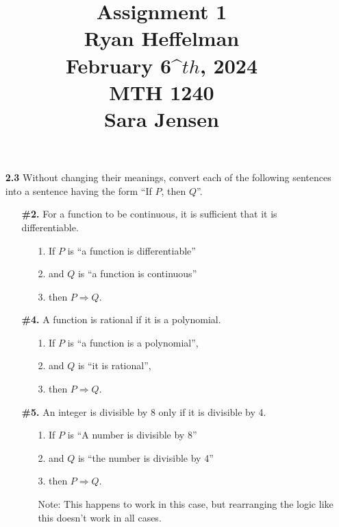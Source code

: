 \documentclass[16pt]{article}
\begin{document}
\large
\date{}
\title{\Large Assignment 1 \\ Ryan Heffelman \\ February 6^\(th\), 2024 \\ MTH 1240 \\ Sara Jensen}
\maketitle
\begin{enumerate}
    \item[\textbf{2.3  }]  Without changing their meanings, convert each of the following sentences into a sentence having the form ``If $P$, then $Q$''.
    \begin{enumerate}
        \item[\textbf{\#2.}] For a function to be continuous, it is sufficient that it is differentiable.
        \begin{enumerate}
            \item[1.] If $P$ is ``a function is differentiable''
            \item[2.] and $Q$ is ``a function is continuous''
            \item[3.] then $P\Rightarrow Q$.
        \end{enumerate}
        \item[\textbf{\#4.}] A function is rational if it is a polynomial.
        \begin{enumerate}
            \item[1.] If $P$ is ``a function is a polynomial'',
            \item[2.] and $Q$ is ``it is rational'',
            \item[3.] then $P\Rightarrow Q$.
        \end{enumerate}
        \item[\textbf{\#5.}] An integer is divisible by 8 only if it is divisible by 4.
        \begin{enumerate}
            \item[1. ] If $P$ is ``A number is divisible by 8''
            \item[2. ] and $Q$ is ``the number is divisible by 4''
            \item[3. ] then $P \Rightarrow Q$.
            \item[Note: ] This happens to work in this case, but rearranging the logic like this doesn't work in all cases.
        \end{enumerate}
        \\

\end{enumerate}
\end{enumerate}
\end{document}
